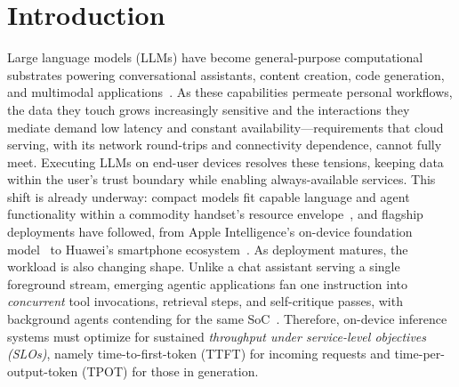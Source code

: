 \documentclass[sigconf,nonacm,10pt]{acmart}
\begin{document}
\section{Introduction}
Large language models (LLMs) have become general-purpose computational substrates powering conversational assistants, content creation, code generation, and multimodal applications~\cite{brown2020language,grattafiori2024llama3,yang2025qwen3}. As these capabilities permeate personal workflows, the data they touch grows increasingly sensitive and the interactions they mediate demand low latency and constant availability---requirements that cloud serving, with its network round-trips and connectivity dependence, cannot fully meet. Executing LLMs on end-user devices resolves these tensions, keeping data within the user's trust boundary while enabling always-available services. This shift is already underway: compact models fit capable language and agent functionality within a commodity handset's resource envelope~\cite{abdin2024phi3,yi2024phonelm,chen2024octopusv2}, and flagship deployments have followed, from Apple Intelligence's on-device foundation model~\cite{gunter2024apple} to Huawei's smartphone ecosystem~\cite{yuan2024mobilefoundation}. As deployment matures, the workload is also changing shape. Unlike a chat assistant serving a single foreground stream, emerging agentic applications fan one instruction into \emph{concurrent} tool invocations, retrieval steps, and self-critique passes, with background agents contending for the same SoC~\cite{claudecode}.  Therefore, on-device inference systems must optimize for sustained \emph{throughput under service-level objectives (SLOs)}, namely time-to-first-token (TTFT) for incoming requests and time-per-output-token (TPOT) for those in generation.
\end{document}
